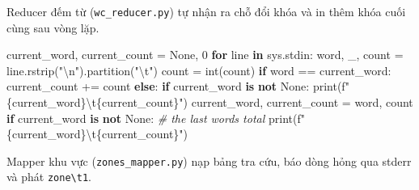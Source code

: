 \documentclass[
  12pt,
  a4paper,
]{report}
\newenvironment{Shaded}{}{}
\newcommand{\BuiltInTok}[1]{\textcolor[rgb]{0.00,0.50,0.00}{#1}}
\newcommand{\CharTok}[1]{\textcolor[rgb]{0.25,0.44,0.63}{#1}}
\newcommand{\CommentTok}[1]{\textcolor[rgb]{0.38,0.63,0.69}{\textit{#1}}}
\newcommand{\ControlFlowTok}[1]{\textcolor[rgb]{0.00,0.44,0.13}{\textbf{#1}}}
\newcommand{\DecValTok}[1]{\textcolor[rgb]{0.25,0.63,0.44}{#1}}
\newcommand{\KeywordTok}[1]{\textcolor[rgb]{0.00,0.44,0.13}{\textbf{#1}}}
\newcommand{\NormalTok}[1]{#1}
\newcommand{\OperatorTok}[1]{\textcolor[rgb]{0.40,0.40,0.40}{#1}}
\newcommand{\SpecialCharTok}[1]{\textcolor[rgb]{0.25,0.44,0.63}{#1}}
\newcommand{\SpecialStringTok}[1]{\textcolor[rgb]{0.73,0.40,0.53}{#1}}
\newcommand{\StringTok}[1]{\textcolor[rgb]{0.25,0.44,0.63}{#1}}
\newcommand{\VariableTok}[1]{\textcolor[rgb]{0.10,0.09,0.49}{#1}}
\begin{document}
Reducer đếm từ (\texttt{wc\_reducer.py}) tự nhận ra chỗ đổi khóa và in
thêm khóa cuối cùng sau vòng lặp.

\begin{Shaded}
\begin{Highlighting}[]
\NormalTok{current\_word, current\_count }\OperatorTok{=} \VariableTok{None}\NormalTok{, }\DecValTok{0}
\ControlFlowTok{for}\NormalTok{ line }\KeywordTok{in}\NormalTok{ sys.stdin:}
\NormalTok{    word, \_, count }\OperatorTok{=}\NormalTok{ line.rstrip(}\StringTok{"}\CharTok{\textbackslash{}n}\StringTok{"}\NormalTok{).partition(}\StringTok{"}\CharTok{\textbackslash{}t}\StringTok{"}\NormalTok{)}
\NormalTok{    count }\OperatorTok{=} \BuiltInTok{int}\NormalTok{(count)}
    \ControlFlowTok{if}\NormalTok{ word }\OperatorTok{==}\NormalTok{ current\_word:}
\NormalTok{        current\_count }\OperatorTok{+=}\NormalTok{ count}
    \ControlFlowTok{else}\NormalTok{:}
        \ControlFlowTok{if}\NormalTok{ current\_word }\KeywordTok{is} \KeywordTok{not} \VariableTok{None}\NormalTok{:}
            \BuiltInTok{print}\NormalTok{(}\SpecialStringTok{f"}\SpecialCharTok{\{}\NormalTok{current\_word}\SpecialCharTok{\}}\CharTok{\textbackslash{}t}\SpecialCharTok{\{}\NormalTok{current\_count}\SpecialCharTok{\}}\SpecialStringTok{"}\NormalTok{)}
\NormalTok{        current\_word, current\_count }\OperatorTok{=}\NormalTok{ word, count}
\ControlFlowTok{if}\NormalTok{ current\_word }\KeywordTok{is} \KeywordTok{not} \VariableTok{None}\NormalTok{:  }\CommentTok{\# the last word\textquotesingle{}s total}
    \BuiltInTok{print}\NormalTok{(}\SpecialStringTok{f"}\SpecialCharTok{\{}\NormalTok{current\_word}\SpecialCharTok{\}}\CharTok{\textbackslash{}t}\SpecialCharTok{\{}\NormalTok{current\_count}\SpecialCharTok{\}}\SpecialStringTok{"}\NormalTok{)}
\end{Highlighting}
\end{Shaded}

Mapper khu vực (\texttt{zones\_mapper.py}) nạp bảng tra cứu, báo dòng
hỏng qua stderr và phát \texttt{zone\textbackslash{}t1}.
\end{document}
